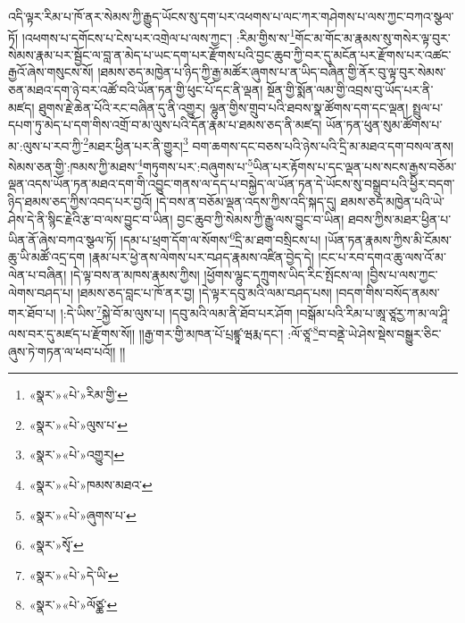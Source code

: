 འདི་ལྟར་རིམ་པ་ཁོ་ནར་སེམས་ཀྱི་རྒྱུད་ཡོངས་སུ་དག་པར་འཕགས་པ་ལང་ཀར་གཤེགས་པ་ལས་ཀྱང་བཀའ་སྩལ་ཏོ། །འཕགས་པ་དགོངས་པ་ངེས་པར་འགྲེལ་པ་ལས་ཀྱང་། :རིམ་གྱིས་ས་\footnote{«སྣར་»«པེ་»རིམ་གྱི་}གོང་མ་གོང་མ་རྣམས་སུ་གསེར་ལྟ་བུར་སེམས་རྣམ་པར་སྦྱོང་ལ་བླ་ན་མེད་པ་ཡང་དག་པར་རྫོགས་པའི་བྱང་ཆུབ་ཀྱི་བར་དུ་མངོན་པར་རྫོགས་པར་འཚང་རྒྱའོ་ཞེས་གསུངས་སོ། །ཐམས་ཅད་མཁྱེན་པ་ཉིད་ཀྱི་རྒྱ་མཚོར་ཞུགས་པ་ན་ཡིད་བཞིན་གྱི་ནོར་བུ་ལྟ་བུར་སེམས་ཅན་མཐའ་དག་ཉེ་བར་འཚོ་བའི་ཡོན་ཏན་གྱི་ཕུང་པོ་དང་ནི་ལྡན། སྔོན་གྱི་སྨོན་ལམ་གྱི་འབྲས་བུ་ཡོད་པར་ནི་མཛད། ཐུགས་རྗེ་ཆེན་པོའི་རང་བཞིན་དུ་ནི་འགྱུར། ལྷུན་གྱིས་གྲུབ་པའི་ཐབས་སྣ་ཚོགས་དག་དང་ལྡན། སྤྲུལ་པ་དཔག་ཏུ་མེད་པ་དག་གིས་འགྲོ་བ་མ་ལུས་པའི་དོན་རྣམ་པ་ཐམས་ཅད་ནི་མཛད། ཡོན་ཏན་ཕུན་སུམ་ཚོགས་པ་མ་:ལུས་པ་རབ་ཀྱི་\footnote{«སྣར་»«པེ་»ལུས་པ་}མཐར་ཕྱིན་པར་ནི་གྱུར།\footnote{«སྣར་»«པེ་»འགྱུར།} བག་ཆགས་དང་བཅས་པའི་ཉེས་པའི་དྲི་མ་མཐའ་དག་བསལ་ནས། སེམས་ཅན་གྱི་:ཁམས་ཀྱི་མཐས་\footnote{«སྣར་»«པེ་»ཁམས་མཐའ་}གཏུགས་པར་:བཞུགས་པ་\footnote{«སྣར་»«པེ་»ཞུགས་པ་}ཡིན་པར་རྟོགས་པ་དང་ལྡན་པས་སངས་རྒྱས་བཅོམ་ལྡན་འདས་ཡོན་ཏན་མཐའ་དག་གི་འབྱུང་གནས་ལ་དད་པ་བསྐྱེད་ལ་ཡོན་ཏན་དེ་ཡོངས་སུ་བསྒྲུབ་པའི་ཕྱིར་བདག་ཉིད་ཐམས་ཅད་ཀྱིས་འབད་པར་བྱའོ། །དེ་བས་ན་བཅོམ་ལྡན་འདས་ཀྱིས་འདི་སྐད་དུ། ཐམས་ཅད་མཁྱེན་པའི་ཡེ་ཤེས་དེ་ནི་སྙིང་རྗེའི་རྩ་བ་ལས་བྱུང་བ་ཡིན། བྱང་ཆུབ་ཀྱི་སེམས་ཀྱི་རྒྱུ་ལས་བྱུང་བ་ཡིན། ཐབས་ཀྱིས་མཐར་ཕྱིན་པ་ཡིན་ནོ་ཞེས་བཀའ་སྩལ་ཏོ། །དམ་པ་ཕྲག་དོག་ལ་སོགས་\footnote{«སྣར་»སྭོ་}དྲི་མ་ཐག་བསྲིངས་པ། །ཡོན་ཏན་རྣམས་ཀྱིས་མི་ངོམས་ཆུ་ཡི་མཚོ་འདྲ་དག །རྣམ་པར་ཕྱེ་ནས་ལེགས་པར་བཤད་རྣམས་འཛིན་བྱེད་དེ། །ངང་པ་རབ་དགའ་ཆུ་ལས་འོ་མ་ལེན་པ་བཞིན། །དེ་ལྟ་བས་ན་མཁས་རྣམས་ཀྱིས། །ཕྱོགས་ལྷུང་དཀྲུགས་ཡིད་རིང་སྤོངས་ལ། །བྱིས་པ་ལས་ཀྱང་ལེགས་བཤད་པ། །ཐམས་ཅད་བླང་པ་ཁོ་ནར་བྱ། །དེ་ལྟར་དབུ་མའི་ལམ་བཤད་པས། །བདག་གིས་བསོད་ནམས་གར་ཐོབ་པ། །:དེ་ཡིས་\footnote{«སྣར་»«པེ་»དེ་ཡི་}སྐྱེ་བོ་མ་ལུས་པ། །དབུ་མའི་ལམ་ནི་ཐོབ་པར་ཤོག །བསྒོམ་པའི་རིམ་པ་ཨཱ་ཙཱརྱ་ཀ་མ་ལ་ཤཱི་ལས་བར་དུ་མཛད་པ་རྫོགས་སོ།། །།རྒྱ་གར་གྱི་མཁན་པོ་པྲཛྙཱ་ཝརྨ་དང་། :ལོ་ཙཱ་\footnote{«སྣར་»«པེ་»ལོཙྪ་}བ་བནྡེ་ཡེ་ཤེས་སྡེས་བསྒྱུར་ཅིང་ཞུས་ཏེ་གཏན་ལ་ཕབ་པའོ།། །།